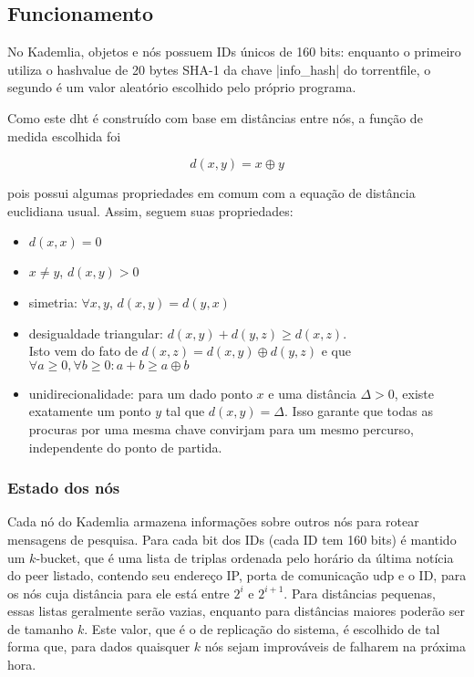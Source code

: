 \begin{itemize}
\subsection*{Funcionamento}

No Kademlia, objetos e nós possuem IDs únicos de 160 bits: enquanto o primeiro utiliza
o \gls*{hashvalue} de 20 bytes SHA-1 da chave \bverb|info_hash| do \gls*{torrentfile},
o segundo é um valor aleatório escolhido pelo próprio programa.

Como este \gls*{dht} é construído com base em distâncias entre nós, a função de medida
escolhida foi

\begin{equation}
    d(x,y) = x \oplus y
\end{equation}

pois possui algumas propriedades em comum com a equação de distância euclidiana usual.
Assim, seguem suas propriedades:

\begin{itemize}
    \item $d(x,x) = 0$
    \item $x \neq y$, $d(x,y) > 0$
    \item simetria: $\forall x,y$, $d(x,y) = d(y,x)$
    \item desigualdade triangular: $d(x,y) + d(y,z) \geq d(x,z)$. \\
        Isto vem do fato de $d(x,z) = d(x,y) \oplus d(y,z)$ e que $\forall a \geq 0,
        \forall b \geq 0 : a + b \geq a \oplus b$
    \item unidirecionalidade: para um dado ponto $x$ e uma distância $\Delta > 0$,
        existe exatamente um ponto $y$ tal que $d(x,y) = \Delta$. Isso garante que todas
        as procuras por uma mesma chave convirjam para um mesmo percurso, independente
        do ponto de partida.
\end{itemize}

\subsubsection*{Estado dos nós}

Cada nó do Kademlia armazena informações sobre outros nós para rotear mensagens de
pesquisa. Para cada bit dos IDs (cada ID tem 160 bits) é mantido um $k$-bucket, que é
uma lista de triplas ordenada pelo horário da última notícia do \gls*{peer} listado,
contendo seu endereço IP, porta de comunicação \gls*{udp} e o ID, para os nós cuja
distância para ele está entre $2^i$ e $2^{i+1}$. Para distâncias pequenas, essas listas
geralmente serão vazias, enquanto para distâncias maiores poderão ser de tamanho $k$.
Este valor, que é o de replicação do sistema, é escolhido de tal forma que, para dados
quaisquer $k$ nós sejam improváveis de falharem na próxima hora.


\end{itemize}
